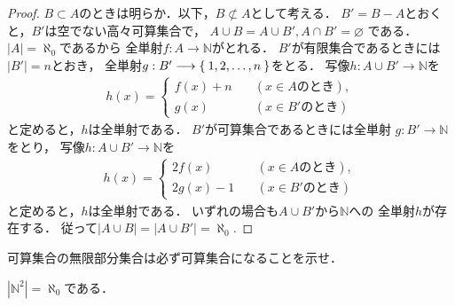    \begin{proof}
     $B \subset A$のときは明らか．以下，$B \not\subset A$として考える．
     $B' = B-A$とおくと，$B'$は空でない高々可算集合で，
     $A \cup B = A \cup B' ,  A \cap B' = \varnothing$
     である．$\lvert A \rvert = \aleph _0$であるから
     全単射$f: A \longrightarrow \mathbb{N}$がとれる．
     $B'$が有限集合であるときには$\lvert B' \rvert = n$とおき，
     全単射$g: B' \longrightarrow \Set{1,2, \ldots , n}$をとる．
     写像$h: A \cup B' \longrightarrow \mathbb{N}$を
     \begin{align*}
       h(x) = \left \{
         \begin{aligned}
           f(x) + n \quad & ( x \in A \text{のとき}) , \\
           g(x) \qquad & ( x \in B' \text{のとき} )  
         \end{aligned}
         \right.
     \end{align*}
     と定めると，$h$は全単射である．
     $B'$が可算集合であるときには全単射
     $g: B' \longrightarrow \mathbb{N}$をとり，
     写像$h: A \cup B' \longrightarrow \mathbb{N}$を
     \begin{align*}
       h(x) = \left \{
         \begin{aligned}
           2 f (x ) \qquad & ( x \in A \text{のとき}) , \\
           2g(x) -1 \quad & ( x \in B' \text{のとき})
         \end{aligned}
         \right.
     \end{align*}
     と定めると，$h$は全単射である．
     いずれの場合も$A \cup B'$から$\mathbb{N}$への
     全単射$h$が存在する．
     従って$\lvert A \cup B \rvert = \lvert A \cup B' \rvert = \aleph_0 .$
   \end{proof}

   \begin{que} \label{que:casansubcasan}
     可算集合の無限部分集合は必ず可算集合になることを示せ．
   \end{que}

  
   \begin{thm} \label{thm:n2casan}
     $\left \lvert \mathbb{N} ^2 \right \rvert = \aleph _0$である．
   \end{thm}

